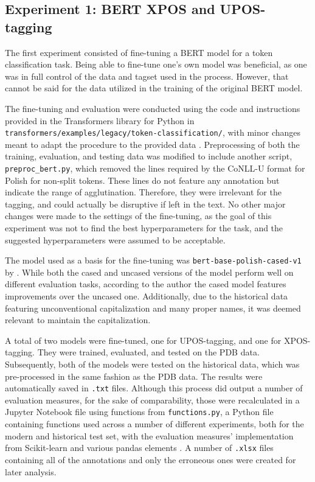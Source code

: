 \subsection{Experiment 1: BERT XPOS and UPOS-tagging}
\label{subsec:bert-tagging}

The first experiment consisted of fine-tuning a BERT model for a token classification task. Being able to fine-tune one's own model was beneficial, as one was in full control of the data and tagset used in the process. However, that cannot be said for the data utilized in the training of the original BERT model. 

The fine-tuning and evaluation were conducted using the code and instructions provided in the Transformers library for Python in \texttt{transformers/examples/legacy/token-classification/}, with minor changes meant to adapt the procedure to the provided data  \citep{wolf-etal-2020-transformers}. Preprocessing of both the training, evaluation, and testing data was modified to include another script, \texttt{preproc\_bert.py}, which removed the lines required by the CoNLL-U format for Polish for non-split tokens. These lines do not feature any annotation but indicate the range of agglutination. Therefore, they were irrelevant for the tagging, and could actually be disruptive if left in the text. No other major changes were made to the settings of the fine-tuning, as the goal of this experiment was not to find the best hyperparameters for the task, and the suggested hyperparameters were assumed to be acceptable.

The model used as a basis for the fine-tuning was \texttt{bert-base-polish-cased-v1} by \citet{kłeczek_2021}. While both the cased and uncased versions of the model perform well on different evaluation tasks, according to the author the cased model features improvements over the uncased one. Additionally, due to the historical data featuring unconventional capitalization and many proper names, it was deemed relevant to maintain the capitalization.

A total of two models were fine-tuned, one for UPOS-tagging, and one for XPOS-tagging. They were trained, evaluated, and tested on the PDB data. Subsequently, both of the models were tested on the historical data, which was pre-processed in the same fashion as the PDB data. The results were automatically saved in \texttt{.txt} files. Although this process did output a number of evaluation measures, for the sake of comparability, those were recalculated in a Jupyter Notebook file using functions from \texttt{functions.py}, a Python file containing functions used across a number of different experiments, both for the modern and historical test set, with the evaluation measures' implementation from Scikit-learn and various pandas elements \citep{scikit-learn, reback2020pandas, mckinney-proc-scipy-2010}. A number of \texttt{.xlsx} files containing all of the annotations and only the erroneous ones were created for later analysis. 

